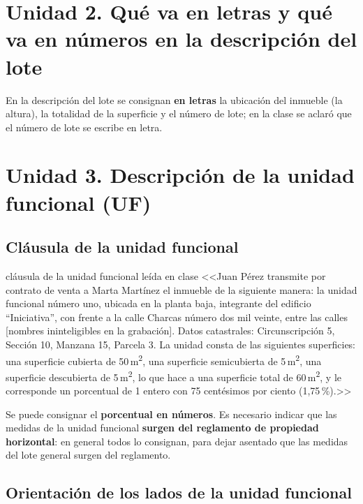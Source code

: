 \documentclass[12pt,oneside,a4paper]{book}
\begin{document}
\section{Unidad 2. Qué va en letras y qué va en números en la descripción del lote}

En la descripción del lote se consignan \textbf{en letras} la ubicación del inmueble (la altura), la totalidad de la superficie y el número de lote; en la clase se aclaró que el número de lote se escribe en letra.

\section{Unidad 3. Descripción de la unidad funcional (UF)}

\subsection{Cláusula de la unidad funcional}

\begin{example}{cláusula de la unidad funcional leída en clase}
<<Juan Pérez transmite por contrato de venta a Marta Martínez el inmueble de la siguiente manera: la unidad funcional número uno, ubicada en la planta baja, integrante del edificio ``Iniciativa'', con frente a la calle Charcas número dos mil veinte, entre las calles [nombres ininteligibles en la grabación]. Datos catastrales: Circunscripción 5, Sección 10, Manzana 15, Parcela 3. La unidad consta de las siguientes superficies: una superficie cubierta de 50\,m\textsuperscript{2}, una superficie semicubierta de 5\,m\textsuperscript{2}, una superficie descubierta de 5\,m\textsuperscript{2}, lo que hace a una superficie total de 60\,m\textsuperscript{2}, y le corresponde un porcentual de 1 entero con 75 centésimos por ciento (1,75\,\%).>>
\end{example}

Se puede consignar el \textbf{porcentual en números}. Es necesario indicar que las medidas de la unidad funcional \textbf{surgen del reglamento de propiedad horizontal}: en general todos lo consignan, para dejar asentado que las medidas del lote general surgen del reglamento.

\subsection{Orientación de los lados de la unidad funcional}
\end{document}
